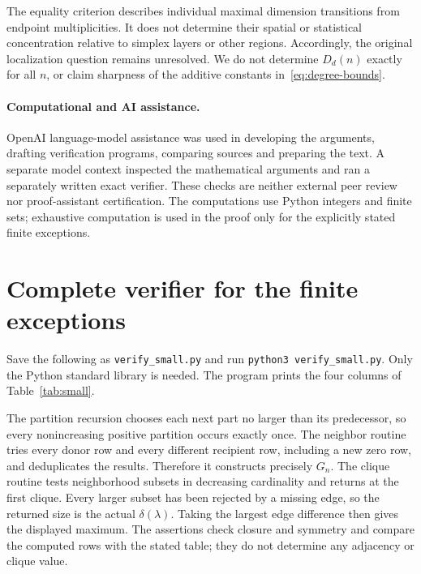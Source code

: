 \documentclass[11pt]{article}
\begin{document}
The equality criterion describes individual maximal dimension transitions
from endpoint multiplicities. It does not determine their spatial or
statistical concentration relative to simplex layers or other regions.
Accordingly, the original localization question remains unresolved.
We do not determine $D_d(n)$ exactly for all $n$, or claim sharpness of
the additive constants in~\eqref{eq:degree-bounds}.

\paragraph{Computational and AI assistance.}
OpenAI language-model assistance was used in developing the arguments,
drafting verification programs, comparing sources and preparing the text.
A separate model context inspected the mathematical arguments and ran a
separately written exact verifier. These checks are neither external peer
review nor proof-assistant certification. The computations use Python
integers and finite sets; exhaustive computation is used in the proof only
for the explicitly stated finite exceptions.

\appendix
\section{Complete verifier for the finite exceptions}\label{app:verifier}

Save the following as \texttt{verify\_small.py} and run
\texttt{python3 verify\_small.py}. Only the Python standard library is
needed. The program prints the four columns of Table~\ref{tab:small}.

The partition recursion chooses each next part no larger than its
predecessor, so every nonincreasing positive partition occurs exactly once.
The neighbor routine tries every donor row and every different recipient
row, including a new zero row, and deduplicates the results. Therefore it
constructs precisely $G_n$. The clique routine tests neighborhood subsets
in decreasing cardinality and returns at the first clique. Every larger
subset has been rejected by a missing edge, so the returned size is the
actual $\delta(\lambda)$. Taking the largest edge difference then gives
the displayed maximum. The assertions check closure and symmetry and
compare the computed rows with the stated table; they do not determine
any adjacency or clique value.
\end{document}
